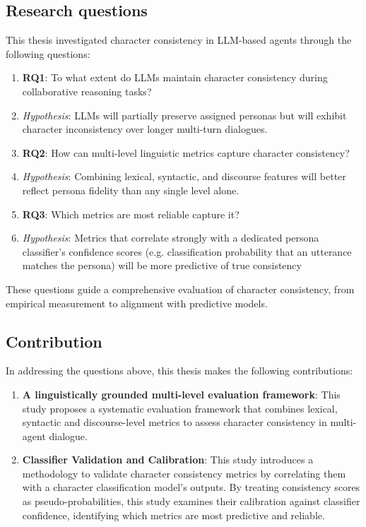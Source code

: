 \documentclass{article}
\begin{document}
\subsection{Research questions}
This thesis investigated character consistency in LLM-based agents through the following questions:
\begin{enumerate}
    \item \textbf{RQ1}: To what extent do LLMs maintain character consistency during collaborative reasoning tasks?
    \item[] \textit{Hypothesis}: LLMs will partially preserve assigned personas but will exhibit character inconsistency over longer multi-turn dialogues. 
    \item \textbf{RQ2}: How can multi-level linguistic metrics capture character consistency?
    \item[] \textit{Hypothesis}: Combining lexical, syntactic, and discourse features will better reflect persona fidelity than any single level alone.
    \item \textbf{RQ3}: Which metrics are most reliable capture it?
    \item[] \textit{Hypothesis}: Metrics that correlate strongly with a dedicated persona classifier’s confidence scores (e.g. classification probability that an utterance matches the persona) will be more predictive of true consistency
\end{enumerate}

These questions guide a comprehensive evaluation of character consistency, from empirical measurement to alignment with predictive models.

\subsection{Contribution}
In addressing the questions above, this thesis makes the following contributions:
\begin{enumerate}
    \item \textbf{A linguistically grounded multi-level evaluation framework}: This study proposes a systematic evaluation framework that combines lexical, syntactic and discourse-level metrics to assess character consistency in multi-agent dialogue.
    \item \textbf{Classifier Validation and Calibration}: This study introduces a methodology to validate character consistency metrics by correlating them with a character classification model’s outputs. By treating consistency scores as pseudo-probabilities, this study examines their calibration against classifier confidence, identifying which metrics are most predictive and reliable.
\end{enumerate}
\end{document}
